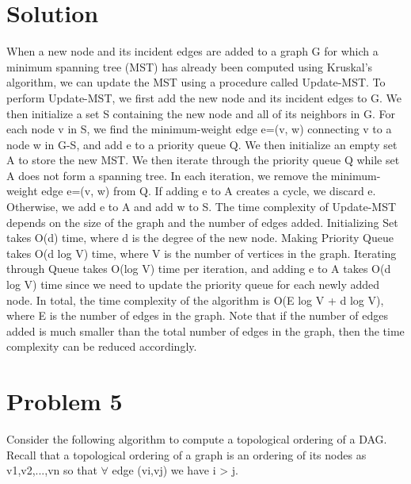 \documentclass{article}
\begin{document}
\section*{\huge Solution}
\large When a new node and its incident edges are added to a graph G for which a minimum spanning tree (MST) has already been computed using Kruskal's algorithm, we can update the MST using a procedure called Update-MST.\newline \newline
To perform Update-MST, we first add the new node and its incident edges to G.\newline \newline
We then initialize a set S containing the new node and all of its neighbors in G.\newline \newline
For each node v in S, we find the minimum-weight edge e=(v, w) connecting v to a node w in G-S, and add e to a priority queue Q. We then initialize an empty set A to store the new MST.
We then iterate through the priority queue Q while set A does not form a spanning tree. In each iteration, we remove the minimum-weight edge e=(v, w) from Q. If adding e to A creates a cycle, we discard e. Otherwise, we add e to A and add w to S.
The time complexity of Update-MST depends on the size of the graph and the number of edges added. Initializing Set takes O(d) time, where d is the degree of the new node. Making Priority Queue takes O(d log V) time, where V is the number of vertices in the graph. Iterating through Queue takes O(log V) time per iteration, and adding e to A takes O(d log V) time since we need to update the priority queue for each newly added node.\newline \newline
In total, the time complexity of the algorithm is O(E log V + d log V), where E is the number of edges in the graph. Note that if the number of edges added is much smaller than the total number of edges in the graph, then the time complexity can be reduced accordingly.

\pagebreak


\section*{\huge Problem 5}

\Large  Consider the following algorithm to	compute	a topological	ordering of	a DAG. Recall that a topological ordering of	a graph is an ordering of its nodes	as v1,v2,...,vn so	that $\forall$ edge	(vi,vj)	we have	i >	j.
\end{document}
